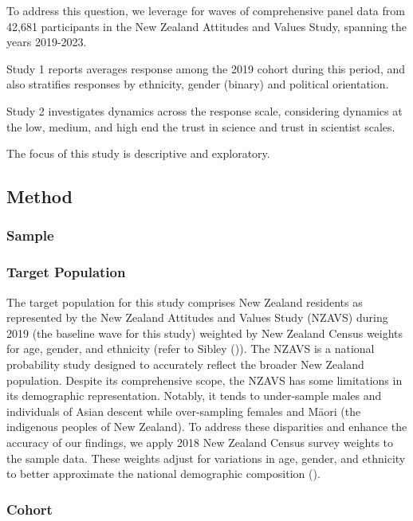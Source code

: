\documentclass[
  single column]{article}
\begin{document}
To address this question, we leverage for waves of comprehensive panel
data from 42,681 participants in the New Zealand Attitudes and Values
Study, spanning the years 2019-2023.

Study 1 reports averages response among the 2019 cohort during this
period, and also stratifies responses by ethnicity, gender (binary) and
political orientation.

Study 2 investigates dynamics across the response scale, considering
dynamics at the low, medium, and high end the trust in science and trust
in scientist scales.

The focus of this study is descriptive and exploratory.

\subsection{Method}\label{method}

\subsubsection{Sample}\label{sample}

\subsubsection{Target Population}\label{target-population}

The target population for this study comprises New Zealand residents as
represented by the New Zealand Attitudes and Values Study (NZAVS) during
2019 (the baseline wave for this study) weighted by New Zealand Census
weights for age, gender, and ethnicity (refer to Sibley
()). The NZAVS is a national probability
study designed to accurately reflect the broader New Zealand population.
Despite its comprehensive scope, the NZAVS has some limitations in its
demographic representation. Notably, it tends to under-sample males and
individuals of Asian descent while over-sampling females and Māori (the
indigenous peoples of New Zealand). To address these disparities and
enhance the accuracy of our findings, we apply 2018 New Zealand Census
survey weights to the sample data. These weights adjust for variations
in age, gender, and ethnicity to better approximate the national
demographic composition ().

\subsubsection{Cohort}\label{cohort}
\end{document}
